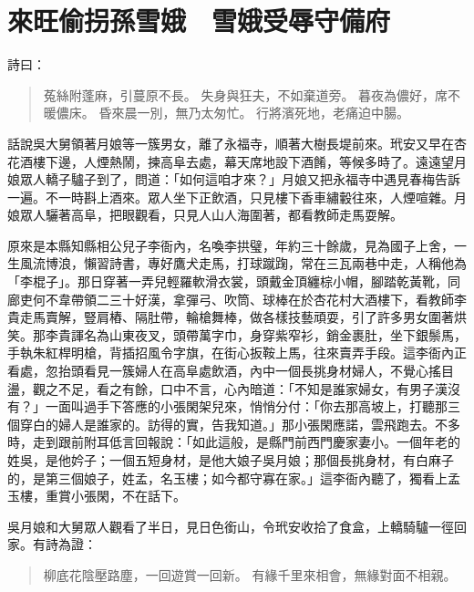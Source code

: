
\chapter{來旺偷拐孫雪娥　雪娥受辱守備府}

詩曰：
\begin{quote}
菟絲附蓬麻，引蔓原不長。
失身與狂夫，不如棄道旁。
暮夜為儂好，席不暖儂床。
昏來晨一別，無乃太匆忙。
行將濱死地，老痛迫中腸。
\end{quote}

話說吳大舅領著月娘等一簇男女，離了永福寺，順著大樹長堤前來。玳安又早在杏花酒樓下邊，人煙熱鬧，揀高阜去處，幕天席地設下酒餚，等候多時了。遠遠望月娘眾人轎子驢子到了，問道：「如何這咱才來？」月娘又把永福寺中遇見春梅告訴一遍。不一時斟上酒來。眾人坐下正飲酒，只見樓下香車繡轂往來，人煙喧雜。月娘眾人驪著高阜，把眼觀看，只見人山人海圍著，都看教師走馬耍解。

原來是本縣知縣相公兒子李衙內，名喚李拱璧，年約三十餘歲，見為國子上舍，一生風流博浪，懶習詩書，專好鷹犬走馬，打球蹴踘，常在三瓦兩巷中走，人稱他為「李棍子」。那日穿著一弄兒輕羅軟滑衣裳，頭戴金頂纏棕小帽，腳踏乾黃靴，同廊吏何不韋帶領二三十好漢，拿彈弓、吹筒、球棒在於杏花村大酒樓下，看教師李貴走馬賣解，豎肩樁、隔肚帶，輪槍舞棒，做各樣技藝頑耍，引了許多男女圍著烘笑。那李貴諢名為山東夜叉，頭帶萬字巾，身穿紫窄衫，銷金裹肚，坐下銀鬃馬，手執朱紅桿明槍，背插招風令字旗，在街心扳鞍上馬，往來賣弄手段。這李衙內正看處，忽抬頭看見一簇婦人在高阜處飲酒，內中一個長挑身材婦人，不覺心搖目盪，觀之不足，看之有餘，口中不言，心內暗道：「不知是誰家婦女，有男子漢沒有？」一面叫過手下答應的小張閑架兒來，悄悄分付：「你去那高坡上，打聽那三個穿白的婦人是誰家的。訪得的實，告我知道。」那小張閑應諾，雲飛跑去。不多時，走到跟前附耳低言回報說：「如此這般，是縣門前西門慶家妻小。一個年老的姓吳，是他妗子；一個五短身材，是他大娘子吳月娘；那個長挑身材，有白麻子的，是第三個娘子，姓孟，名玉樓；如今都守寡在家。」這李衙內聽了，獨看上孟玉樓，重賞小張閑，不在話下。

吳月娘和大舅眾人觀看了半日，見日色銜山，令玳安收拾了食盒，上轎騎驢一徑回家。有詩為證：
\begin{quote}
柳底花陰壓路塵，一回遊賞一回新。
有緣千里來相會，無緣對面不相親。
\end{quote}

